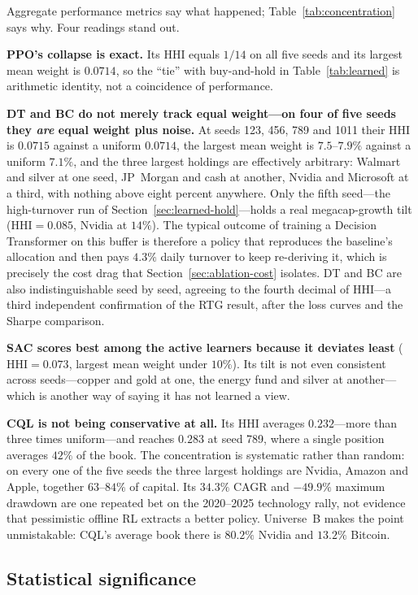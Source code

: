 \documentclass[11pt]{article}
\begin{document}
Aggregate performance metrics say what happened; Table~\ref{tab:concentration} says why. Four
readings stand out.

\textbf{PPO's collapse is exact.} Its HHI equals $1/14$ on all five seeds and its largest mean
weight is $0.0714$, so the ``tie'' with buy-and-hold in Table~\ref{tab:learned} is arithmetic
identity, not a coincidence of performance.

\textbf{DT and BC do not merely track equal weight---on four of five seeds they \emph{are} equal
weight plus noise.} At seeds 123, 456, 789 and 1011 their HHI is $0.0715$ against a uniform
$0.0714$, the largest mean weight is $7.5$--$7.9\%$ against a uniform $7.1\%$, and the three
largest holdings are effectively arbitrary: Walmart and silver at one seed, JP~Morgan and cash at
another, Nvidia and Microsoft at a third, with nothing above eight percent anywhere. Only the
fifth seed---the high-turnover run of Section~\ref{sec:learned-hold}---holds a real
megacap-growth tilt ($\mathrm{HHI} = 0.085$, Nvidia at $14\%$). The typical outcome of training a
Decision Transformer on this buffer is therefore a policy that reproduces the baseline's
allocation and then pays $4.3\%$ daily turnover to keep re-deriving it, which is precisely the
cost drag that Section~\ref{sec:ablation-cost} isolates. DT and BC are also indistinguishable
seed by seed, agreeing to the fourth decimal of HHI---a third independent confirmation of the
RTG result, after the loss curves and the Sharpe comparison.

\textbf{SAC scores best among the active learners because it deviates least}
($\mathrm{HHI} = 0.073$, largest mean weight under $10\%$). Its tilt is not even consistent
across seeds---copper and gold at one, the energy fund and silver at another---which is another
way of saying it has not learned a view.

\textbf{CQL is not being conservative at all.} Its HHI averages $0.232$---more than three times
uniform---and reaches $0.283$ at seed 789, where a single position averages $42\%$ of the book.
The concentration is systematic rather than random: on every one of the five seeds the three
largest holdings are Nvidia, Amazon and Apple, together $63$--$84\%$ of capital. Its $34.3\%$
CAGR and $-49.9\%$ maximum drawdown are one repeated bet on the 2020--2025 technology rally, not
evidence that pessimistic offline RL extracts a better policy. Universe~B makes the point
unmistakable: CQL's average book there is $80.2\%$ Nvidia and $13.2\%$ Bitcoin.

\subsection{Statistical significance}
\end{document}
